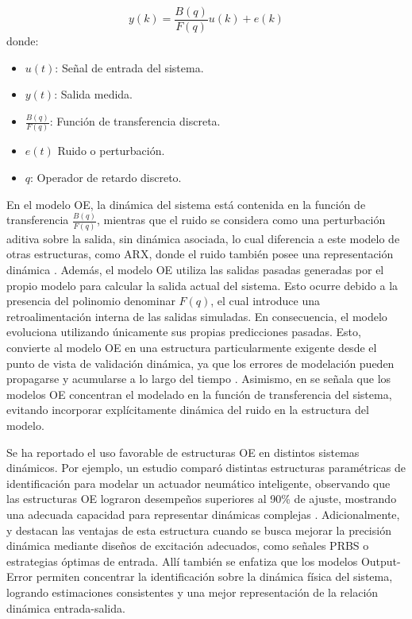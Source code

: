 \documentclass[11pt]{report}
\begin{document}
\begin{equation}    \label{ecuacionOE}
y(k)=\frac{B(q)}{F(q)}u(k)+e(k)
\end{equation}
donde:
\begin{itemize}
    \item $u(t)$: Señal de entrada del sistema.
    \item $y(t)$: Salida medida.
    \item $\frac{B(q)}{F(q)}$: Función de transferencia discreta.
    \item $e(t)$ Ruido o perturbación.
    \item $q$: Operador de retardo discreto.
    
\end{itemize}
En el modelo OE, la dinámica del sistema está contenida en la función de transferencia $\frac{B(q)}{F(q)}$, mientras que el ruido se considera como una perturbación aditiva sobre la salida, sin dinámica asociada, lo cual diferencia a este modelo de otras estructuras, como ARX, donde el  ruido también posee una representación dinámica \cite{ljung1999system}.
Además, el modelo OE utiliza las salidas pasadas generadas por el propio modelo para calcular la salida actual del sistema. Esto ocurre debido a la presencia del polinomio denominar $F(q)$, el cual introduce una retroalimentación interna de las salidas simuladas. En consecuencia, el modelo evoluciona utilizando únicamente sus propias predicciones pasadas. Esto, convierte al modelo OE en una estructura particularmente exigente desde el punto de vista de validación dinámica, ya que los errores de modelación pueden propagarse y acumularse a lo largo del tiempo \cite{ljung1999system}.
Asimismo, en \cite{tangirala2018principles} se señala que los modelos OE concentran el modelado en la función de transferencia del sistema, evitando incorporar explícitamente dinámica del ruido en la estructura del modelo.

Se ha reportado el uso favorable de estructuras OE en distintos sistemas dinámicos. Por ejemplo, un estudio comparó distintas estructuras paramétricas de identificación para modelar un actuador neumático inteligente, observando que las estructuras OE lograron desempeños superiores al 90\% de ajuste, mostrando una adecuada capacidad para representar dinámicas complejas \cite{Muftah2021}. Adicionalmente, \cite{stojanovic2014adaptive} y \cite{STOJANOVIC2016576} destacan las ventajas de esta estructura cuando se busca mejorar la precisión dinámica mediante diseños de excitación adecuados, como señales PRBS o estrategias óptimas de entrada. Allí también se enfatiza que los modelos Output-Error permiten concentrar la identificación sobre la dinámica física del sistema, logrando estimaciones consistentes y una mejor representación de la relación dinámica entrada-salida.
\end{document}
